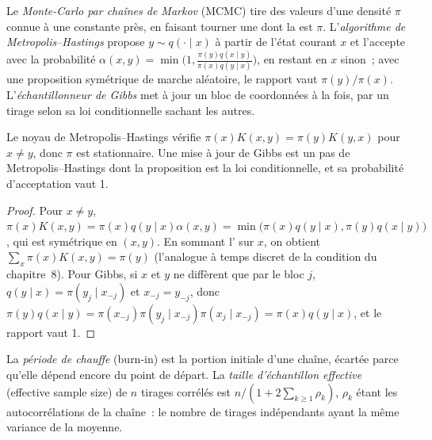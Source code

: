 \begin{definition}\label{def:qm:bayesian-methods:mcmc}
Le \emph{Monte-Carlo par chaînes de Markov} (MCMC) tire des valeurs d'une densité $\pi$ connue à une constante près, en faisant tourner une
 dont la  est $\pi$. L'\emph{algorithme de Metropolis--Hastings}
propose $y \sim q(\cdot \mid x)$ à partir de l'état courant $x$ et l'accepte avec la probabilité $\alpha(x, y) = \min\bigl(1,
\frac{\pi(y)q(x \mid y)}{\pi(x)q(y \mid x)}\bigr)$, en restant en $x$ sinon~; avec une proposition symétrique de marche aléatoire, le rapport vaut
$\pi(y)/\pi(x)$. L'\emph{échantillonneur de Gibbs} met à jour un bloc de coordonnées à la fois, par un tirage selon sa loi conditionnelle
sachant les autres.
\end{definition}

\begin{proposition}\label{prop:qm:bayesian-methods:mh}
Le noyau de Metropolis--Hastings vérifie $\pi(x)K(x, y) = \pi(y)K(y, x)$ pour $x \ne y$, donc $\pi$ est stationnaire. Une mise à jour de Gibbs est un
pas de Metropolis--Hastings dont la proposition est la loi conditionnelle, et sa probabilité d'acceptation vaut 1.
\end{proposition}

\begin{proof}
Pour $x \ne y$, $\pi(x)K(x, y) = \pi(x)q(y \mid x)\alpha(x, y) = \min\bigl(\pi(x)q(y \mid x), \pi(y)q(x \mid y)\bigr)$, qui est symétrique en
$(x, y)$. En sommant l' sur $x$, on obtient $\sum_x\pi(x)K(x, y) = \pi(y)$ (l'analogue à temps discret de la condition
du chapitre~8). Pour Gibbs, si $x$ et $y$ ne diffèrent que par le bloc $j$, $q(y \mid x) = \pi(y_j \mid x_{-j})$ et $x_{-j} = y_{-j}$, donc
$\pi(y)q(x \mid y) = \pi(x_{-j})\pi(y_j \mid x_{-j})\pi(x_j \mid x_{-j}) = \pi(x)q(y \mid x)$, et le rapport vaut 1.
\end{proof}

\begin{definition}\label{def:qm:bayesian-methods:ess}
La \emph{période de chauffe} (burn-in) est la portion initiale d'une chaîne, écartée parce qu'elle dépend encore du point de départ. La
\emph{taille d'échantillon effective} (effective sample size) de $n$ tirages corrélés est $n/(1 + 2\sum_{k \ge 1}\rho_k)$, $\rho_k$ étant les
autocorrélations de la chaîne~: le nombre de tirages indépendants ayant la même variance de la moyenne.
\end{definition}

